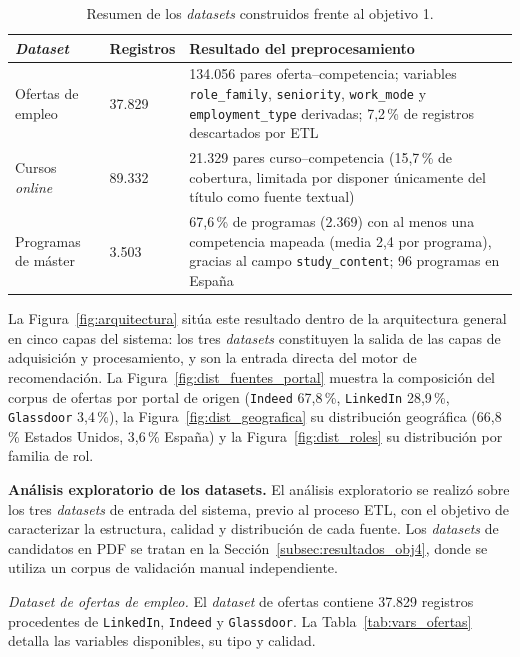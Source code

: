 \begin{table}[H]
  \caption{Resumen de los \textit{datasets} construidos frente al objetivo 1.}
  \label{tab:resumen_datasets}
  \centering
  \footnotesize
  \begin{tabular}{|p{4.5cm}|p{2.0cm}|p{7.0cm}|}
    \hline
    \rowcolor{gray!15}
    \textbf{\textit{Dataset}} & \textbf{Registros} & \textbf{Resultado del preprocesamiento} \\
    \hline
    Ofertas de empleo & 37.829 & 134.056 pares oferta--competencia; variables \texttt{role\_family}, \texttt{seniority}, \texttt{work\_mode} y \texttt{employment\_type} derivadas; 7,2\,\% de registros descartados por ETL \\
    \hline
    Cursos \textit{online} & 89.332 & 21.329 pares curso--competencia (15,7\,\% de cobertura, limitada por disponer únicamente del título como fuente textual) \\
    \hline
    Programas de máster & 3.503 & 67,6\,\% de programas (2.369) con al menos una competencia mapeada (media 2,4 por programa), gracias al campo \texttt{study\_content}; 96 programas en España \\
    \hline
  \end{tabular}
\end{table}

La Figura~\ref{fig:arquitectura} sitúa este resultado dentro de la arquitectura general en cinco capas del sistema: los tres \textit{datasets} constituyen la salida de las capas de adquisición y procesamiento, y son la entrada directa del motor de recomendación. La Figura~\ref{fig:dist_fuentes_portal} muestra la composición del corpus de ofertas por portal de origen (\texttt{Indeed} 67,8\,\%, \texttt{LinkedIn} 28,9\,\%, \texttt{Glassdoor} 3,4\,\%), la Figura~\ref{fig:dist_geografica} su distribución geográfica (66,8\,\% Estados Unidos, 3,6\,\% España) y la Figura~\ref{fig:dist_roles} su distribución por familia de rol.

\textbf{Análisis exploratorio de los datasets.} El análisis exploratorio se realizó sobre los tres \textit{datasets} de entrada del sistema, previo al proceso ETL, con el objetivo de caracterizar la estructura, calidad y distribución de cada fuente. Los \textit{datasets} de candidatos en PDF se tratan en la Sección~\ref{subsec:resultados_obj4}, donde se utiliza un corpus de validación manual independiente.

\textit{Dataset de ofertas de empleo.} El \textit{dataset} de ofertas contiene 37.829 registros procedentes de \texttt{LinkedIn}, \texttt{Indeed} y \texttt{Glassdoor}. La Tabla~\ref{tab:vars_ofertas} detalla las variables disponibles, su tipo y calidad.

